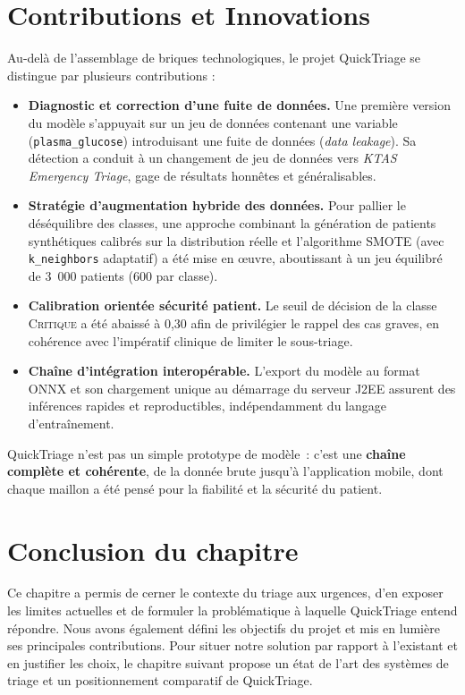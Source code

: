 \section{Contributions et Innovations}
Au-delà de l'assemblage de briques technologiques, le projet QuickTriage se distingue par
plusieurs contributions :
\begin{itemize}
  \item \textbf{Diagnostic et correction d'une fuite de données.} Une première version du
  modèle s'appuyait sur un jeu de données contenant une variable (\texttt{plasma\_glucose})
  introduisant une fuite de données (\textit{data leakage}). Sa détection a conduit à un
  changement de jeu de données vers \textit{KTAS Emergency Triage}, gage de résultats
  honnêtes et généralisables.
  \item \textbf{Stratégie d'augmentation hybride des données.} Pour pallier le déséquilibre
  des classes, une approche combinant la génération de patients synthétiques calibrés sur la
  distribution réelle et l'algorithme SMOTE (avec \texttt{k\_neighbors} adaptatif) a été mise
  en œuvre, aboutissant à un jeu équilibré de 3~000 patients (600 par classe).
  \item \textbf{Calibration orientée sécurité patient.} Le seuil de décision de la classe
  \textsc{Critique} a été abaissé à 0,30 afin de privilégier le rappel des cas graves, en
  cohérence avec l'impératif clinique de limiter le sous-triage.
  \item \textbf{Chaîne d'intégration interopérable.} L'export du modèle au format ONNX et son
  chargement unique au démarrage du serveur J2EE assurent des inférences rapides et
  reproductibles, indépendamment du langage d'entraînement.
\end{itemize}

\begin{successbox}
QuickTriage n'est pas un simple prototype de modèle~: c'est une \textbf{chaîne complète et
cohérente}, de la donnée brute jusqu'à l'application mobile, dont chaque maillon a été
pensé pour la fiabilité et la sécurité du patient.
\end{successbox}

\section*{Conclusion du chapitre}
Ce chapitre a permis de cerner le contexte du triage aux urgences, d'en exposer les limites
actuelles et de formuler la problématique à laquelle QuickTriage entend répondre. Nous avons
également défini les objectifs du projet et mis en lumière ses principales contributions.
Pour situer notre solution par rapport à l'existant et en justifier les choix, le chapitre
suivant propose un état de l'art des systèmes de triage et un positionnement comparatif de
QuickTriage.
